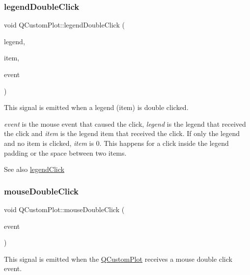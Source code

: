 \subsubsection{\texorpdfstring{legend\+Double\+Click}{legendDoubleClick}}
{\footnotesize\ttfamily void Q\+Custom\+Plot\+::legend\+Double\+Click (\begin{DoxyParamCaption}\item[{\hyperlink{class_q_c_p_legend}{Q\+C\+P\+Legend} $\ast$}]{legend,  }\item[{\hyperlink{class_q_c_p_abstract_legend_item}{Q\+C\+P\+Abstract\+Legend\+Item} $\ast$}]{item,  }\item[{Q\+Mouse\+Event $\ast$}]{event }\end{DoxyParamCaption})\hspace{0.3cm}{\ttfamily [signal]}}

This signal is emitted when a legend (item) is double clicked.

{\itshape event} is the mouse event that caused the click, {\itshape legend} is the legend that received the click and {\itshape item} is the legend item that received the click. If only the legend and no item is clicked, {\itshape item} is 0. This happens for a click inside the legend padding or the space between two items.

\begin{DoxySeeAlso}{See also}
\hyperlink{class_q_custom_plot_a79cff0baafbca10a3aaf694d2d3b9ab3}{legend\+Click} 
\end{DoxySeeAlso}
\hypertarget{class_q_custom_plot_a9b232142c64fcf273a953ee08e5b90e9}{}\label{class_q_custom_plot_a9b232142c64fcf273a953ee08e5b90e9} 
\subsubsection{\texorpdfstring{mouse\+Double\+Click}{mouseDoubleClick}}
{\footnotesize\ttfamily void Q\+Custom\+Plot\+::mouse\+Double\+Click (\begin{DoxyParamCaption}\item[{Q\+Mouse\+Event $\ast$}]{event }\end{DoxyParamCaption})\hspace{0.3cm}{\ttfamily [signal]}}

This signal is emitted when the \hyperlink{class_q_custom_plot}{Q\+Custom\+Plot} receives a mouse double click event. \hypertarget{class_q_custom_plot_a742ca4f94688bed2a685fd8a56ce5704}{}\label{class_q_custom_plot_a742ca4f94688bed2a685fd8a56ce5704} 
